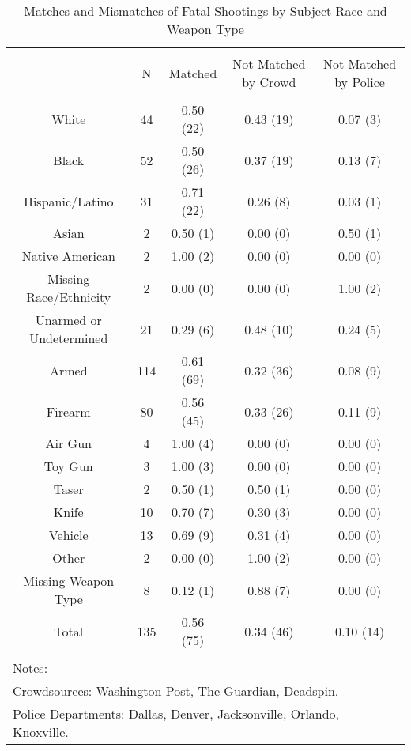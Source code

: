 
\begin{table}[!htbp] \centering 
  \caption{Matches and Mismatches of Fatal Shootings by Subject Race and Weapon Type} 
  \label{} 
\footnotesize 
\begin{tabular}{@{\extracolsep{5pt}} ccccc} 
\\[-1.8ex]\hline 
\hline \\[-1.8ex] 
 & N & Matched & Not Matched by Crowd & Not Matched by Police \\ 
\hline \\[-1.8ex] 
White & 44 & 0.50 (22) & 0.43 (19) & 0.07 (3) \\ 
Black & 52 & 0.50 (26) & 0.37 (19) & 0.13 (7) \\ 
Hispanic/Latino & 31 & 0.71 (22) & 0.26 (8) & 0.03 (1) \\ 
Asian & 2 & 0.50 (1) & 0.00 (0) & 0.50 (1) \\ 
Native American & 2 & 1.00 (2) & 0.00 (0) & 0.00 (0) \\ 
Missing Race/Ethnicity & 2 & 0.00 (0) & 0.00 (0) & 1.00 (2) \\ 
Unarmed or Undetermined & 21 & 0.29 (6) & 0.48 (10) & 0.24 (5) \\ 
Armed & 114 & 0.61 (69) & 0.32 (36) & 0.08 (9) \\ 
Firearm & 80 & 0.56 (45) & 0.33 (26) & 0.11 (9) \\ 
Air Gun & 4 & 1.00 (4) & 0.00 (0) & 0.00 (0) \\ 
Toy Gun & 3 & 1.00 (3) & 0.00 (0) & 0.00 (0) \\ 
Taser & 2 & 0.50 (1) & 0.50 (1) & 0.00 (0) \\ 
Knife & 10 & 0.70 (7) & 0.30 (3) & 0.00 (0) \\ 
Vehicle & 13 & 0.69 (9) & 0.31 (4) & 0.00 (0) \\ 
Other & 2 & 0.00 (0) & 1.00 (2) & 0.00 (0) \\ 
Missing Weapon Type & 8 & 0.12 (1) & 0.88 (7) & 0.00 (0) \\ 
Total & 135 & 0.56 (75) & 0.34 (46) & 0.10 (14) \\ 
\hline \\[-1.8ex] 
\multicolumn{5}{l}{Notes:} \\ 
\multicolumn{5}{l}{Crowdsources: Washington Post, The Guardian, Deadspin.} \\ 
\multicolumn{5}{l}{Police Departments: Dallas, Denver, Jacksonville, Orlando, Knoxville.} \\ 
\end{tabular} 
\end{table}  
